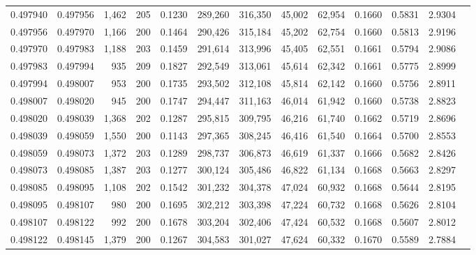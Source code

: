 \begin{tabular}{rrrrrrrrrrrrr}
0.497940 & 0.497956 & 1,462 & 205 &                                     0.1230 & 289,260 & 316,350 &  45,002 &  62,954 & 0.1660 & 0.5831 & 2.9304 \\
0.497956 & 0.497970 & 1,166 & 200 &                                     0.1464 & 290,426 & 315,184 &  45,202 &  62,754 & 0.1660 & 0.5813 & 2.9196 \\
0.497970 & 0.497983 & 1,188 & 203 &                                     0.1459 & 291,614 & 313,996 &  45,405 &  62,551 & 0.1661 & 0.5794 & 2.9086 \\
0.497983 & 0.497994 &   935 & 209 &                                     0.1827 & 292,549 & 313,061 &  45,614 &  62,342 & 0.1661 & 0.5775 & 2.8999 \\
0.497994 & 0.498007 &   953 & 200 &                                     0.1735 & 293,502 & 312,108 &  45,814 &  62,142 & 0.1660 & 0.5756 & 2.8911 \\
0.498007 & 0.498020 &   945 & 200 &                                     0.1747 & 294,447 & 311,163 &  46,014 &  61,942 & 0.1660 & 0.5738 & 2.8823 \\
0.498020 & 0.498039 & 1,368 & 202 &                                     0.1287 & 295,815 & 309,795 &  46,216 &  61,740 & 0.1662 & 0.5719 & 2.8696 \\
0.498039 & 0.498059 & 1,550 & 200 &                                     0.1143 & 297,365 & 308,245 &  46,416 &  61,540 & 0.1664 & 0.5700 & 2.8553 \\
0.498059 & 0.498073 & 1,372 & 203 &                                     0.1289 & 298,737 & 306,873 &  46,619 &  61,337 & 0.1666 & 0.5682 & 2.8426 \\
0.498073 & 0.498085 & 1,387 & 203 &                                     0.1277 & 300,124 & 305,486 &  46,822 &  61,134 & 0.1668 & 0.5663 & 2.8297 \\
0.498085 & 0.498095 & 1,108 & 202 &                                     0.1542 & 301,232 & 304,378 &  47,024 &  60,932 & 0.1668 & 0.5644 & 2.8195 \\
0.498095 & 0.498107 &   980 & 200 &                                     0.1695 & 302,212 & 303,398 &  47,224 &  60,732 & 0.1668 & 0.5626 & 2.8104 \\
0.498107 & 0.498122 &   992 & 200 &                                     0.1678 & 303,204 & 302,406 &  47,424 &  60,532 & 0.1668 & 0.5607 & 2.8012 \\
0.498122 & 0.498145 & 1,379 & 200 &                                     0.1267 & 304,583 & 301,027 &  47,624 &  60,332 & 0.1670 & 0.5589 & 2.7884 \\

\end{tabular}
